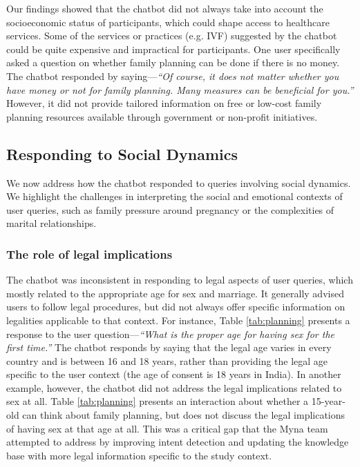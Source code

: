 Our findings showed that the chatbot did not always take into account the socioeconomic status of participants, which could shape access to healthcare services. 
Some of the services or practices  (e.g. IVF) suggested by the chatbot could be quite expensive and impractical for participants.
One user specifically asked a question on whether family planning can be done if there is no money. The chatbot responded by saying---\textit{``Of course, it does not matter whether you have money or not for family planning. Many measures can be beneficial for you.''} However, it did not provide tailored information on free or low-cost family planning resources available through government or non-profit initiatives. %


\subsection{Responding to Social Dynamics}
We now address how the chatbot responded to queries involving social dynamics. We highlight the challenges in interpreting the social and emotional contexts of user queries, such as family pressure around pregnancy or the complexities of marital relationships.

\subsubsection{The role of legal implications}
The chatbot was inconsistent in responding to legal aspects of user queries, which mostly related to the appropriate age for sex and marriage. 
It generally advised users to follow legal procedures, but did not always offer specific information on legalities applicable to that context. 
For instance, Table \ref{tab:planning} presents a response to the user question---\textit{``What is the proper age for having sex for the first time.''} The chatbot responds by saying that the legal age varies in every country and is between 16 and 18 years, rather than providing the legal age specific to the user context (the age of consent is 18 years in India). 
In another example, however, the chatbot did not address the legal implications related to sex at all.
Table \ref{tab:planning} presents an interaction about whether a 15-year-old can think about family planning, but does not discuss the legal implications of having sex at that age at all.
This was a critical gap that the Myna team attempted to address by improving intent detection and updating the knowledge base with more legal information specific to the study context.


